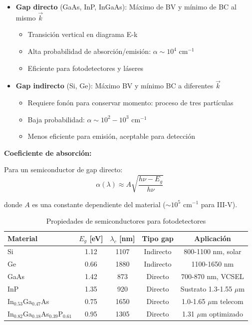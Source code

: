 \documentclass[11pt,a4paper]{article}
\begin{document}
\begin{itemize}
    \item \textbf{Gap directo} (GaAs, InP, InGaAs): Máximo de BV y mínimo de BC al mismo $\vec{k}$
    \begin{itemize}
        \item Transición vertical en diagrama E-k
        \item Alta probabilidad de absorción/emisión: $\alpha \sim 10^4$ cm$^{-1}$
        \item Eficiente para fotodetectores y láseres
    \end{itemize}
    
    \item \textbf{Gap indirecto} (Si, Ge): Máximo BV y mínimo BC a diferentes $\vec{k}$
    \begin{itemize}
        \item Requiere fonón para conservar momento: proceso de tres partículas
        \item Baja probabilidad: $\alpha \sim 10^2-10^3$ cm$^{-1}$
        \item Menos eficiente para emisión, aceptable para detección
    \end{itemize}
\end{itemize}

\textbf{Coeficiente de absorción:}

Para un semiconductor de gap directo:
\begin{equation}
    \alpha(\lambda) \approx A\sqrt{\frac{h\nu - E_g}{h\nu}}
\end{equation}

donde $A$ es una constante dependiente del material ($\sim 10^5$ cm$^{-1}$ para III-V).

\begin{table}[h]
\centering
\caption{Propiedades de semiconductores para fotodetectores}
\begin{tabular}{lcccc}
\hline
\textbf{Material} & \textbf{$E_g$ [eV]} & \textbf{$\lambda_c$ [nm]} & \textbf{Tipo gap} & \textbf{Aplicación} \\
\hline
Si & 1.12 & 1107 & Indirecto & 800-1100 nm, solar \\
Ge & 0.66 & 1880 & Indirecto & 1100-1650 nm \\
GaAs & 1.42 & 873 & Directo & 700-870 nm, VCSEL \\
InP & 1.35 & 920 & Directo & Sustrato 1.3-1.55 $\mu$m \\
In$_{0.53}$Ga$_{0.47}$As & 0.75 & 1650 & Directo & 1.0-1.65 $\mu$m telecom \\
In$_{0.82}$Ga$_{0.18}$As$_{0.39}$P$_{0.61}$ & 0.95 & 1305 & Directo & 1.31 $\mu$m optimizado \\
\hline
\end{tabular}
\end{table}
\end{document}
